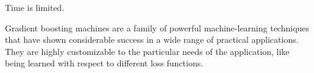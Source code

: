 

Time is limited. 


Gradient boosting machines are a family of  powerful machine-learning techniques that have shown considerable success in a wide range of practical applications. They are highly customizable to the particular needs of the application, like being learned with respect to different loss functions. 